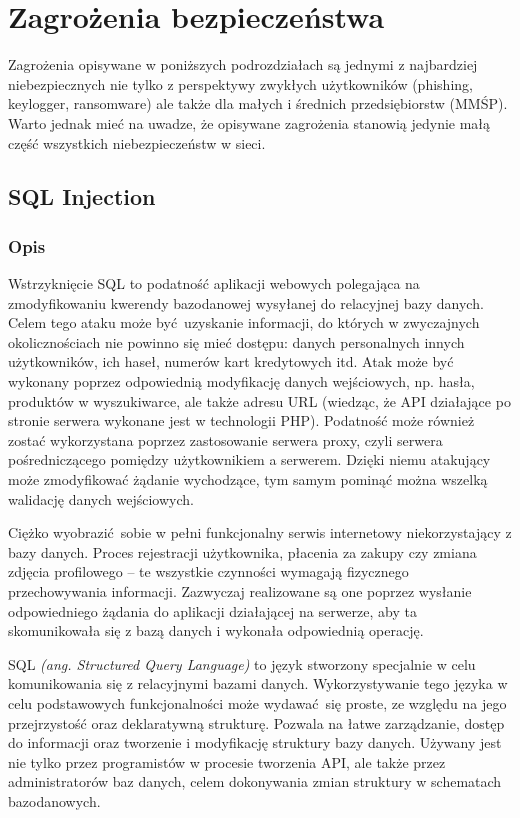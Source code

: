 \documentclass[12pt,twoside]{article}
\begin{document}
\clearpage
\section{Zagrożenia bezpieczeństwa}

Zagrożenia opisywane w poniższych podrozdziałach są jednymi z najbardziej niebezpiecznych nie tylko z perspektywy zwykłych użytkowników (phishing, keylogger, ransomware) ale także dla małych i średnich przedsiębiorstw (MMŚP). Warto jednak mieć na uwadze, że opisywane zagrożenia stanowią jedynie małą część wszystkich niebezpieczeństw w sieci.

\subsection{SQL Injection}

\subsubsection{Opis}

Wstrzyknięcie SQL to podatność aplikacji webowych polegająca na zmodyfikowaniu kwerendy bazodanowej wysyłanej do relacyjnej bazy danych. Celem tego ataku może być uzyskanie informacji, do których w zwyczajnych okolicznościach nie powinno się mieć dostępu: danych personalnych innych użytkowników, ich haseł, numerów kart kredytowych itd. Atak może być wykonany poprzez odpowiednią modyfikację danych wejściowych, np. hasła, produktów w wyszukiwarce, ale także adresu URL (wiedząc, że API działające po stronie serwera wykonane jest w technologii PHP). Podatność może również zostać wykorzystana poprzez zastosowanie serwera proxy, czyli serwera pośredniczącego pomiędzy użytkownikiem a serwerem. Dzięki niemu atakujący może zmodyfikować żądanie wychodzące, tym samym pominąć można wszelką walidację danych wejściowych. 

Ciężko wyobrazić sobie w pełni funkcjonalny serwis internetowy niekorzystający z bazy danych. Proces rejestracji użytkownika, płacenia za zakupy czy zmiana zdjęcia profilowego -- te wszystkie czynności wymagają fizycznego przechowywania informacji. Zazwyczaj realizowane są one poprzez wysłanie odpowiedniego żądania do aplikacji działającej na serwerze, aby ta skomunikowała się z bazą danych i wykonała odpowiednią operację. 

SQL \emph{(ang. Structured Query Language)} to język stworzony specjalnie w celu komunikowania się z relacyjnymi bazami danych. Wykorzystywanie tego języka w celu podstawowych funkcjonalności może wydawać się proste, ze względu na jego przejrzystość oraz deklaratywną strukturę. Pozwala na łatwe zarządzanie, dostęp do informacji oraz tworzenie i modyfikację struktury bazy danych. Używany jest nie tylko przez programistów w procesie tworzenia API, ale także przez administratorów baz danych, celem dokonywania zmian struktury w schematach bazodanowych.
\end{document}
